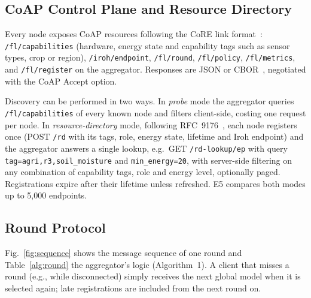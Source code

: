 \documentclass[a4paper,fleqn]{cas-dc}
\begin{document}
\subsection{CoAP Control Plane and Resource Directory}
\label{sec:coap}

Every node exposes CoAP resources following the CoRE link format~\cite{rfc6690}: \texttt{/fl/capabilities} (hardware, energy state and capability tags such as sensor types, crop or region), \texttt{/iroh/endpoint}, \texttt{/fl/round}, \texttt{/fl/policy}, \texttt{/fl/metrics}, and \texttt{/fl/register} on the aggregator. Responses are JSON or CBOR~\cite{rfc8949}, negotiated with the CoAP Accept option.

Discovery can be performed in two ways. In \emph{probe} mode the aggregator queries \texttt{/fl/capabilities} of every known node and filters client-side, costing one request per node. In \emph{resource-directory} mode, following RFC~9176~\cite{rfc9176}, each node registers once (POST \texttt{/rd} with its tags, role, energy state, lifetime and Iroh endpoint) and the aggregator answers a single lookup, e.g.\ GET \texttt{/rd-lookup/ep} with query \texttt{tag=agri,r3,soil\_moisture} and \texttt{min\_energy=20}, with server-side filtering on any combination of capability tags, role and energy level, optionally paged. Registrations expire after their lifetime unless refreshed. E5 compares both modes up to 5{,}000 endpoints.

\subsection{Round Protocol}
\label{sec:round}

Fig.~\ref{fig:sequence} shows the message sequence of one round and Table~\ref{alg:round} the aggregator's logic (Algorithm~1). A client that misses a round (e.g., while disconnected) simply receives the next global model when it is selected again; late registrations are included from the next round on.
\end{document}
